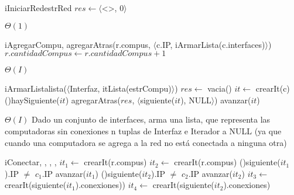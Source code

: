 \begin{Algoritmos}

  
  \begin{algoritmo}{iIniciarRed}{}{estrRed}{
    $res \gets \langle$<>, 0$\rangle$ 
  }
  \end{algoritmo}
 \datosAlgoritmo{} %
  {} %
  {} %
  {$\Theta(1)$} %
  {} %

  \begin{algoritmo}{iAgregarCompu}{, }{}
    agregarAtras(r.compus, $\langle$c.IP, iArmarLista(c.interfaces)$\rangle$)
    $r.cantidadCompus \gets r.cantidadCompus+1$ 
  \end{algoritmo}
 \datosAlgoritmo{} %
  {} %
  {} %
  {$\Theta(I)$} %
  {} %
  
  \begin{algoritmo}{iArmarLista}{}{lista($\langle$Interfaz, itLista(estrCompu)$\rangle$)}
    $res \gets$ vacia()
     $it \gets$ crearIt(c)
    \While(){haySiguiente($it$)}{
      agregarAtras($res$, $\langle$siguiente($it$), NULL$\rangle$)
      avanzar($it$)
    }
  \end{algoritmo}
 \datosAlgoritmo{} %
  {} %
  {} %
  {$\Theta(I)$} %
  {Dado un conjunto de interfaces, arma una lista, que representa las computadoras sin conexiones  n tuplas de Interfaz e Iterador a NULL (ya que cuando una computadora se agrega a la red no est\'{a} conectada a ninguna otra)} %
  
  \begin{algoritmo}{iConectar}{, , , , }{}
     $it_{1} \gets$ crearIt(r.compus)
     $it_{2} \gets$ crearIt(r.compus)
    \While(){siguiente($it_{1}$).IP $\neq$ $c_{1}$.IP}{
      avanzar($it_{1}$)
    }
   \While(){siguiente($it_{2}$).IP $\neq$ $c_{2}$.IP}{
      avanzar($it_{2}$)
    }
     $it_{3} \gets$ crearIt(siguiente($it_{1}$).conexiones))
     $it_{4} \gets$ crearIt(siguiente($it_{2}$).conexiones)
    

\end{algoritmo}
\end{Algoritmos}
